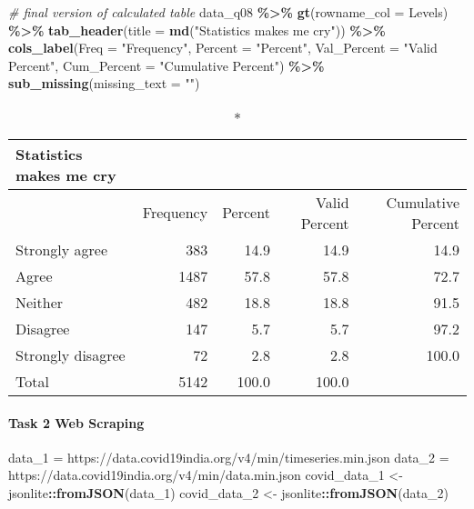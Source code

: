 \documentclass[
]{article}
\newenvironment{Shaded}{\begin{snugshade}}{\end{snugshade}}
\newcommand{\AttributeTok}[1]{\textcolor[rgb]{0.13,0.29,0.53}{#1}}
\newcommand{\CommentTok}[1]{\textcolor[rgb]{0.56,0.35,0.01}{\textit{#1}}}
\newcommand{\FunctionTok}[1]{\textcolor[rgb]{0.13,0.29,0.53}{\textbf{#1}}}
\newcommand{\NormalTok}[1]{#1}
\newcommand{\OtherTok}[1]{\textcolor[rgb]{0.56,0.35,0.01}{#1}}
\newcommand{\SpecialCharTok}[1]{\textcolor[rgb]{0.81,0.36,0.00}{\textbf{#1}}}
\newcommand{\StringTok}[1]{\textcolor[rgb]{0.31,0.60,0.02}{#1}}
\begin{document}
\begin{Shaded}
\begin{Highlighting}[]
\CommentTok{\# final version of calculated table}
\NormalTok{data\_q08 }\SpecialCharTok{\%\textgreater{}\%} \FunctionTok{gt}\NormalTok{(}\AttributeTok{rowname\_col =} \StringTok{\textquotesingle{}Levels\textquotesingle{}}\NormalTok{) }\SpecialCharTok{\%\textgreater{}\%} 
  \FunctionTok{tab\_header}\NormalTok{(}\AttributeTok{title =} \FunctionTok{md}\NormalTok{(}\StringTok{"Statistics makes me cry"}\NormalTok{)) }\SpecialCharTok{\%\textgreater{}\%} 
  \FunctionTok{cols\_label}\NormalTok{(}\AttributeTok{Freq =} \StringTok{"Frequency"}\NormalTok{,}
             \AttributeTok{Percent =} \StringTok{"Percent"}\NormalTok{,}
             \AttributeTok{Val\_Percent =} \StringTok{"Valid Percent"}\NormalTok{,}
             \AttributeTok{Cum\_Percent =} \StringTok{"Cumulative Percent"}\NormalTok{) }\SpecialCharTok{\%\textgreater{}\%} 
  \FunctionTok{sub\_missing}\NormalTok{(}\AttributeTok{missing\_text =} \StringTok{""}\NormalTok{)}
\end{Highlighting}
\end{Shaded}

\begin{longtable}{l|rrrr}
\caption*{
{\large Statistics makes me cry}
} \\ 
\toprule
\multicolumn{1}{l}{} & Frequency & Percent & Valid Percent & Cumulative Percent \\ 
\midrule\addlinespace[2.5pt]
Strongly agree & 383 & 14.9 & 14.9 & 14.9 \\ 
Agree & 1487 & 57.8 & 57.8 & 72.7 \\ 
Neither & 482 & 18.8 & 18.8 & 91.5 \\ 
Disagree & 147 & 5.7 & 5.7 & 97.2 \\ 
Strongly disagree & 72 & 2.8 & 2.8 & 100.0 \\ 
Total & 5142 & 100.0 & 100.0 &  \\ 
\bottomrule
\end{longtable}

\hypertarget{task-2-web-scraping}{%
\paragraph{\texorpdfstring{\textbf{Task 2} Web
Scraping}{Task 2 Web Scraping}}\label{task-2-web-scraping}}

\begin{Shaded}
\begin{Highlighting}[]
\NormalTok{data\_1 }\OtherTok{=} \StringTok{\textquotesingle{}https://data.covid19india.org/v4/min/timeseries.min.json\textquotesingle{}}
\NormalTok{data\_2 }\OtherTok{=} \StringTok{\textquotesingle{}https://data.covid19india.org/v4/min/data.min.json\textquotesingle{}}
\NormalTok{covid\_data\_1 }\OtherTok{\textless{}{-}}\NormalTok{ jsonlite}\SpecialCharTok{::}\FunctionTok{fromJSON}\NormalTok{(data\_1)}
\NormalTok{covid\_data\_2 }\OtherTok{\textless{}{-}}\NormalTok{ jsonlite}\SpecialCharTok{::}\FunctionTok{fromJSON}\NormalTok{(data\_2)}
\end{Highlighting}
\end{Shaded}
\end{document}
